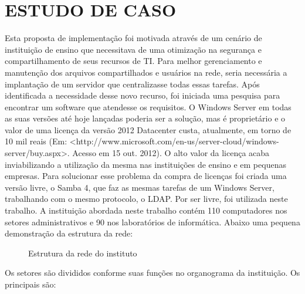 \chapter{ESTUDO DE CASO}

Esta proposta de implementação foi motivada através de um cenário de instituição de ensino que necessitava de uma otimização na segurança e compartilhamento de seus recursos de TI. Para melhor gerenciamento e manutenção dos arquivos compartilhados e usuários na rede, seria necessária a implantação de um servidor que centralizasse todas essas tarefas.
Após identificada a necessidade desse novo recurso, foi iniciada uma pesquisa para encontrar um software que atendesse os requisitos. O Windows Server em todas as suas versões até hoje lançadas poderia ser a solução, mas é proprietário e o valor de uma licença da versão 2012 Datacenter custa, atualmente, em torno de 10 mil reais (Em: <http://www.microsoft.com/en-us/server-cloud/windows-server/buy.aspx>. Acesso em 15 out. 2012). O alto valor da licença acaba inviabilizando a utilização da mesma nas instituições  de ensino e em pequenas empresas. 
Para solucionar esse problema da compra de licenças foi criada uma versão livre, o Samba 4, que faz as mesmas tarefas de um Windows Server, trabalhando com o mesmo protocolo, o LDAP. Por ser livre, foi utilizada neste trabalho.
A instituição abordada neste trabalho contém 110 computadores nos setores administrativos e 90 nos laboratórios de informática. Abaixo uma pequena demonstração da estrutura da rede:

\begin{figure}[ht]
   	\centering
   	\caption{Estrutura da rede do instituto}
    \label{rede}
\end{figure}
          				
Os setores são divididos conforme suas funções no organograma da instituição. Os principais são:


